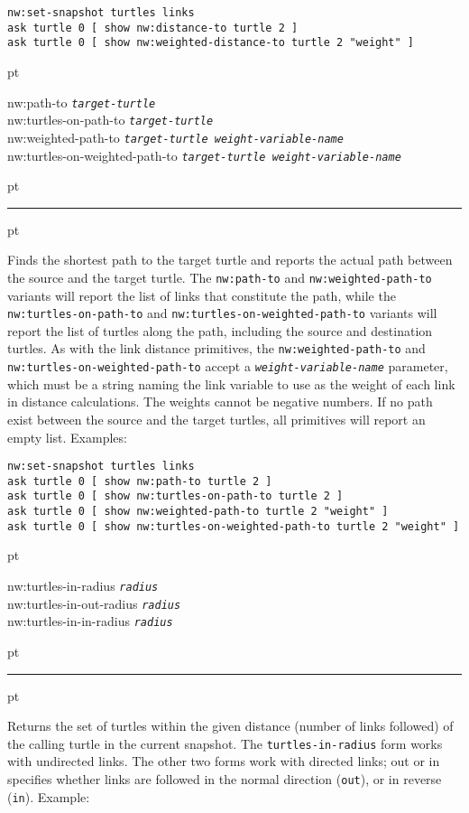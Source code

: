 \documentclass[10pt]{article}
\newenvironment{prim}{
  \leftskip 0cm
  \vskip 6 pt
  \ttfamily
  \bfseries
}{
  \vskip 2 pt
  \hrule
  \vskip 6 pt
}
\newcommand{\param}[1]{\texttt{\textit{\textmd{#1}}}}
\begin{document}
\begin{Verbatim}
nw:set-snapshot turtles links
ask turtle 0 [ show nw:distance-to turtle 2 ]
ask turtle 0 [ show nw:weighted-distance-to turtle 2 "weight" ]
\end{Verbatim}

\begin{prim}
nw:path-to \param{target-turtle}\\
nw:turtles-on-path-to \param{target-turtle}\\
nw:weighted-path-to \param{target-turtle weight-variable-name}\\
nw:turtles-on-weighted-path-to \param{target-turtle weight-variable-name}
\end{prim}

Finds the shortest path to the target turtle and reports the actual path between
the source and the target turtle. The \texttt{nw:path-to} and
\texttt{nw:weighted-path-to} variants will report the list of links that
constitute the path, while the \texttt{nw:turtles-on-path-to} and
\texttt{nw:turtles-on-weighted-path-to} variants will report the list of turtles
along the path, including the source and destination turtles.
As with the link distance primitives, the \texttt{nw:weighted-path-to} and
\texttt{nw:turtles-on-weighted-path-to} accept a \param{weight-variable-name}
parameter, which must be a string naming the link variable to use as the weight
of each link in distance calculations. The weights cannot be negative numbers.
If no path exist between the source and the target turtles, all primitives will
report an empty list. Examples:

\begin{Verbatim}
nw:set-snapshot turtles links
ask turtle 0 [ show nw:path-to turtle 2 ]
ask turtle 0 [ show nw:turtles-on-path-to turtle 2 ]
ask turtle 0 [ show nw:weighted-path-to turtle 2 "weight" ]
ask turtle 0 [ show nw:turtles-on-weighted-path-to turtle 2 "weight" ]
\end{Verbatim}

\begin{prim}
nw:turtles-in-radius \param{radius}\\
nw:turtles-in-out-radius \param{radius}\\
nw:turtles-in-in-radius \param{radius}
\end{prim}

Returns the set of turtles within the given distance (number of links followed)
of the calling turtle in the current snapshot.
The \texttt{turtles-in-radius} form works with undirected links. The other two
forms work with directed links; out or in specifies whether links are followed
in the normal direction (\texttt{out}), or in reverse (\texttt{in}). Example:
\end{document}
